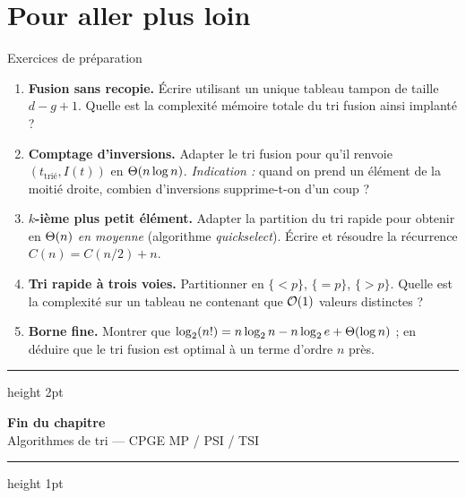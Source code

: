 \documentclass[11pt,aspectratio=169]{beamer}
\begin{document}
\appendix
\section*{Pour aller plus loin}

\begin{frame}{Exercices de préparation}
\begin{enumerate}\small\setlength\itemsep{4pt}
  \item \textbf{Fusion sans recopie.} Écrire  utilisant un
        unique tableau tampon de taille $d-g+1$. Quelle est la complexité mémoire totale du
        tri fusion ainsi implanté ?
  \item \textbf{Comptage d'inversions.} Adapter le tri fusion pour qu'il renvoie
        $(t_{\text{trié}}, I(t))$ en $\Theta(n\log n)$. \emph{Indication :} quand on prend un
        élément de la moitié droite, combien d'inversions supprime-t-on d'un coup ?
  \item \textbf{$k$-ième plus petit élément.} Adapter la partition du tri rapide pour
        obtenir  en $\Theta(n)$ \emph{en moyenne} (algorithme
        \emph{quickselect}). Écrire et résoudre la récurrence $C(n)=C(n/2)+n$.
  \item \textbf{Tri rapide à trois voies.} Partitionner en $\{<p\}$, $\{=p\}$, $\{>p\}$.
        Quelle est la complexité sur un tableau ne contenant que $\mathcal{O}(1)$ valeurs distinctes ?
  \item \textbf{Borne fine.} Montrer que $\log_2(n!)=n\log_2 n-n\log_2 e+\Theta(\log n)$ ;
        en déduire que le tri fusion est optimal à un terme d'ordre $n$ près.
\end{enumerate}
\end{frame}

\begin{frame}[plain]
  \vfill
  \begin{center}
    {\color{teal}\hrule height 2pt}\vspace{10pt}
    {\LARGE\bfseries\color{teal} Fin du chapitre}\\[8pt]
    {\normalsize Algorithmes de tri --- CPGE MP / PSI / TSI}\\[10pt]
    {\color{teal}\hrule height 1pt}
  \end{center}
  \vfill
\end{frame}
\end{document}
